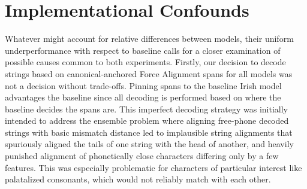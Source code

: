 \documentclass[thesis]{cluu}
\begin{document}
\section{Implementational Confounds}
Whatever might account for relative differences between models, their uniform underperformance with respect to baseline calls for a closer examination of possible causes common to both experiments. Firstly, our decision to decode strings based on canonical-anchored Force Alignment spans for all models was not a decision without trade-offs. Pinning spans to the baseline Irish model advantages the baseline since all decoding is performed based on where the baseline decides the spans are. This imperfect decoding strategy was initially intended to address the ensemble problem where aligning free-phone decoded strings with basic mismatch distance led to implausible string alignments that spuriously aligned the tails of one string with the head of another, and heavily punished alignment of phonetically close characters differing only by a few features. This was especially problematic for characters of particular interest like palatalized consonants, which would not reliably match with each other. 
\end{document}
